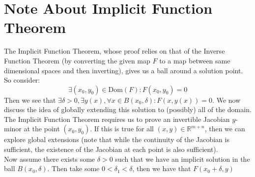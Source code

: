 \documentclass{exam}
\author{Omkar Tasgaonkar}
\begin{document}
\thispagestyle{firstpage}

\section*{Note About Implicit Function Theorem}
The Implicit Function Theorem, whose proof relies on that of the Inverse Function Theorem (by converting the given map $F$ to a map between same dimensional spaces and then inverting), gives us a ball around a solution point. So consider:
\begin{equation*}
  \exists (x_0, y_0) \in \text{Dom}(F): F(x_0, y_0) = 0
\end{equation*}
Then we see that $\exists \delta > 0, \exists y(x), \forall x \in B(x_0, \delta): F(x, y(x)) = 0$. We now discuss the idea of globally extending this solution to (possibly) all of the domain. The Implicit Function Theorem requires us to prove an invertible Jacobian $y$-minor at the point $(x_0, y_0)$. If this is true for all $(x, y) \in \mathbb{R}^{m+n}$, then we can explore global extensions (note that while the continuity of the Jacobian is sufficient, the existence of the Jacobian at each point is also sufficient).\\

Now assume there exists some $\delta > 0$ such that we have an implicit solution in the ball $B(x_0, \delta)$. Then take some $0 < \delta_1 < \delta$, then we have that $F(x_0 + \delta, y)$
\end{document}
